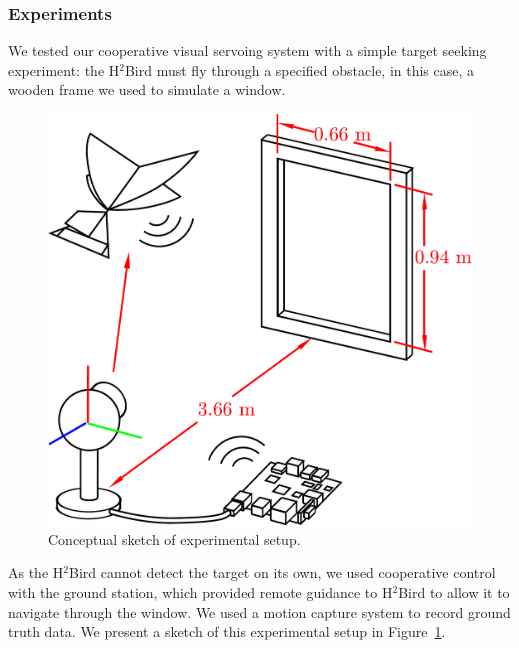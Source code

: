 \documentclass{aamas2013}
\begin{document}
\subsubsection{Experiments}
\label{sec:experiments_verification}

We tested our cooperative visual servoing system with a simple target seeking
experiment: the H$^2$Bird must fly through a specified obstacle, in this 
case, a wooden frame we used to simulate a window.

\begin{figure}[tb]
\centering
\includegraphics[width=\linewidth]{figures/experiment_cartoon.pdf}
\caption{Conceptual sketch of experimental setup.}
\label{fig:experiment_cartoon}
\end{figure}

As the H$^2$Bird cannot detect the target on its own, we used cooperative 
control with the ground station, which provided remote guidance to 
H$^2$Bird to allow it to navigate through the window. We used a motion capture 
system to record ground truth data. We present a sketch of this experimental 
setup in Figure~\ref{fig:experiment_cartoon}.
\end{document}
